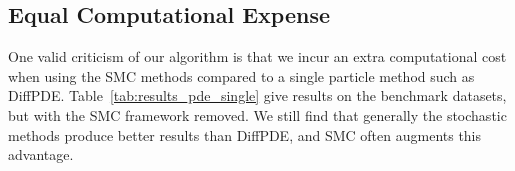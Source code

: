 \newpage
\subsection{Equal Computational Expense} \label{app:comp_expense}

One valid criticism of our algorithm is that we incur an extra computational cost when using the SMC methods compared to a single particle method such as DiffPDE. Table~\ref{tab:results_pde_single} give results on the benchmark datasets, but with the SMC framework removed. We still find that generally the stochastic methods produce better results than DiffPDE, and SMC often augments this advantage. 

\begin{table}[ht]
\centering
\caption{Comparison of different models on five PDE problems (in $L_2$ relative error, except in the Darcy inverse problem where error rate is reported).}
\label{tab:results_pde_single}
\end{table}

